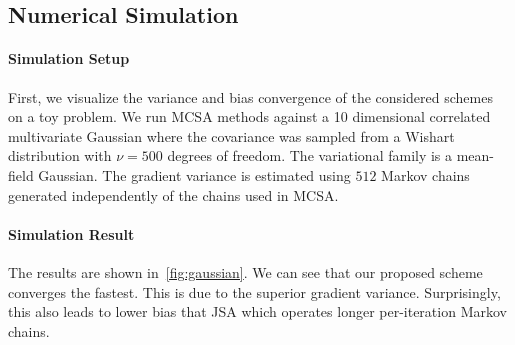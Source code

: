 \subsection{Numerical Simulation}\label{section:simulation}
\paragraph{Simulation Setup}
First, we visualize the variance and bias convergence of the considered schemes on a toy problem.
We run MCSA methods against a 10 dimensional correlated multivariate Gaussian where the covariance was sampled from a Wishart distribution with \(\nu = 500\) degrees of freedom.
The variational family is a mean-field Gaussian.
The gradient variance is estimated using \(512\) Markov chains generated independently of the chains used in MCSA.

\paragraph{Simulation Result}
The results are shown in~\cref{fig:gaussian}.
We can see that our proposed scheme converges the fastest.
This is due to the superior gradient variance.
Surprisingly, this also leads to lower bias that JSA which operates longer per-iteration Markov chains.




